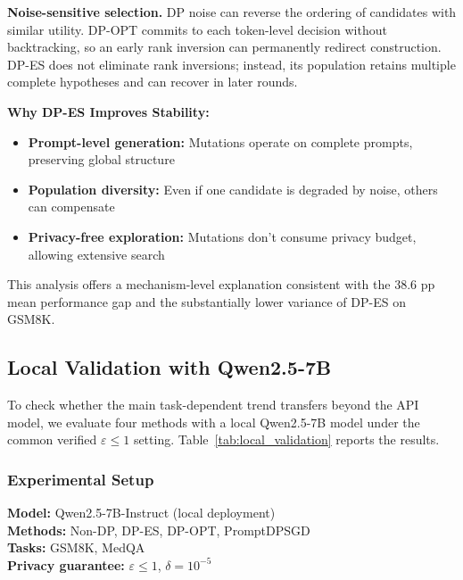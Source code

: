 \noindent \textbf{Noise-sensitive selection.} DP noise can reverse the ordering of candidates with similar utility. DP-OPT commits to each token-level decision without backtracking, so an early rank inversion can permanently redirect construction. DP-ES does not eliminate rank inversions; instead, its population retains multiple complete hypotheses and can recover in later rounds.
\vspace{0.5em}

\noindent \textbf{Why DP-ES Improves Stability:}

\begin{itemize}
    \item \textbf{Prompt-level generation:} Mutations operate on complete prompts, preserving global structure
    \item \textbf{Population diversity:} Even if one candidate is degraded by noise, others can compensate
    \item \textbf{Privacy-free exploration:} Mutations don't consume privacy budget, allowing extensive search
\end{itemize}

This analysis offers a mechanism-level explanation consistent with the 38.6 pp mean performance gap and the substantially lower variance of DP-ES on GSM8K.

\subsection{Local Validation with Qwen2.5-7B}
\label{sec:appendix:local}

\noindent To check whether the main task-dependent trend transfers beyond the API model, we evaluate four methods with a local Qwen2.5-7B model \cite{qwen2.5} under the common verified $\varepsilon\leq1$ setting. Table~\ref{tab:local_validation} reports the results.

\subsubsection{Experimental Setup}

\noindent\textbf{Model:} Qwen2.5-7B-Instruct (local deployment) \\
\textbf{Methods:} Non-DP, DP-ES, DP-OPT, PromptDPSGD \\
\textbf{Tasks:} GSM8K, MedQA \\
\textbf{Privacy guarantee:} $\varepsilon\leq1$, $\delta=10^{-5}$ \\

